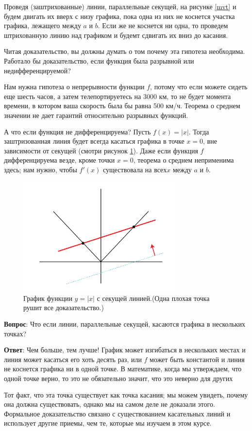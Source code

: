 \documentclass[a4paper,12pt]{article}
\begin{document}
Проведя (заштрихованные) линии, параллельные секущей, на рисунке \ref{mvt} и будем двигать их вверх с низу графика, пока одна из них не коснется участка графика, лежащего между $a$ и $b$. Если же не коснется ни одна, то проведем штрихованную линию над графиком и будемт сдвигать их вниз до касания.

Читая доказательство, вы должны думать о том почему эта гипотеза необходима. Работало бы доказательство, если функция была разрывной или недифференцируемой?

Нам нужна гипотеза о непрерывности функции $f$, потому что если можете сидеть еще шесть часов, а затем телепортируетесь на 3000 км, то не будет момента времени, в котором ваша скорость была бы равна 500 км/ч. Теорема о среднем значении не дает гарантий относительно разрывных функций.

А что если функция не дифференцируема? Пусть $f(x)=|x|$. Тогда заштризованная линия будет всегда касаться графика в точке $x=0$, вне зависимости от секущей (смотри рисунок \ref{ruinmvt}). Даже если функция $f$ дифференцируема везде, кроме точки $x=0$, теорема о среднем неприменима здесь; нам нужно, чтобы $f'(x)$ существовала на $всех x$ между $a$ и $b$.

\begin{figure}[ht]
\centering
\includegraphics[height=6cm]{fig2.png}
\caption{График функции $y=|x|$ с секущей линией.(Одна плохая точка рушит все доказательство.)}
\label{ruinmvt}
\end{figure}

\textbf{Вопрос}: Что если линии, параллельные секущей, касаются графика в нескольких точках?

\textbf{Ответ}: Чем больше, тем лучше! График может изгибаться в нескольких местах и линия может касаться его хоть десять раз, или $f$ может быть константой и линия не коснется графика ни в одной точке. В математике, когда мы утверждаем, что одной точке верно, то это не обязательно значит, что это неверно для других

Тот факт, что эта точка существует как точка касания; мы можем увидеть, почему она должна существовать, однако мы на самом деле не доказали этого. Формальное доказательство связано с существованием касательных линий и использует другие приемы, чем те, которые мы изучаем в этом курсе.
\end{document}

